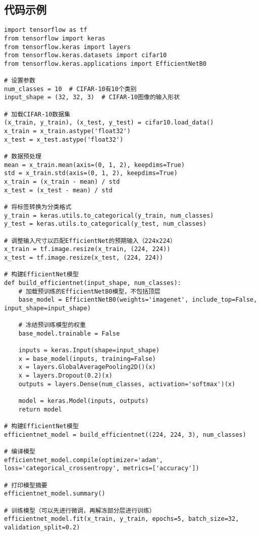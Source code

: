\subsection*{代码示例}
\begin{lstlisting}
import tensorflow as tf
from tensorflow import keras
from tensorflow.keras import layers
from tensorflow.keras.datasets import cifar10
from tensorflow.keras.applications import EfficientNetB0

# 设置参数
num_classes = 10  # CIFAR-10有10个类别
input_shape = (32, 32, 3)  # CIFAR-10图像的输入形状

# 加载CIFAR-10数据集
(x_train, y_train), (x_test, y_test) = cifar10.load_data()
x_train = x_train.astype('float32')
x_test = x_test.astype('float32')

# 数据预处理
mean = x_train.mean(axis=(0, 1, 2), keepdims=True)
std = x_train.std(axis=(0, 1, 2), keepdims=True)
x_train = (x_train - mean) / std
x_test = (x_test - mean) / std

# 将标签转换为分类格式
y_train = keras.utils.to_categorical(y_train, num_classes)
y_test = keras.utils.to_categorical(y_test, num_classes)

# 调整输入尺寸以匹配EfficientNet的预期输入（224x224）
x_train = tf.image.resize(x_train, (224, 224))
x_test = tf.image.resize(x_test, (224, 224))

# 构建EfficientNet模型
def build_efficientnet(input_shape, num_classes):
    # 加载预训练的EfficientNetB0模型，不包括顶层
    base_model = EfficientNetB0(weights='imagenet', include_top=False, input_shape=input_shape)

    # 冻结预训练模型的权重
    base_model.trainable = False

    inputs = keras.Input(shape=input_shape)
    x = base_model(inputs, training=False)
    x = layers.GlobalAveragePooling2D()(x)
    x = layers.Dropout(0.2)(x)
    outputs = layers.Dense(num_classes, activation='softmax')(x)

    model = keras.Model(inputs, outputs)
    return model

# 构建EfficientNet模型
efficientnet_model = build_efficientnet((224, 224, 3), num_classes)

# 编译模型
efficientnet_model.compile(optimizer='adam', loss='categorical_crossentropy', metrics=['accuracy'])

# 打印模型摘要
efficientnet_model.summary()

# 训练模型（可以先进行微调，再解冻部分层进行训练）
efficientnet_model.fit(x_train, y_train, epochs=5, batch_size=32, validation_split=0.2)


\end{lstlisting}
